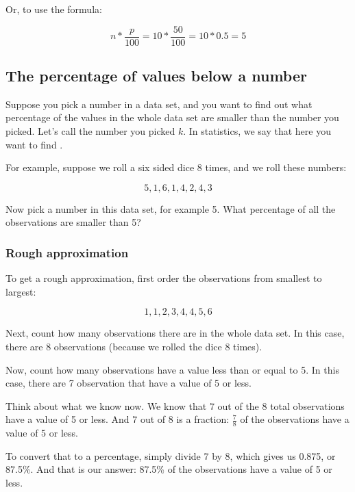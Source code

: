 \documentclass[../../../main.tex]{subfiles}
\begin{document}
\noindent
Or, to use the formula:

\begin{equation*}
  n * \frac{p}{100} = 10 * \frac{50}{100} = 10 * 0.5 = 5
\end{equation*}



\subsection{The percentage of values below a number}

Suppose you pick a number in a data set, and you want to find out what percentage of the values in the whole data set are smaller than the number you picked. Let's call the number you picked $k$. In statistics, we say that here you want to find .

For example, suppose we roll a six sided dice 8 times, and we roll these numbers:

\begin{equation*}
  5, 1, 6, 1, 4, 2, 4, 3
\end{equation*}

\noindent
Now pick a number in this data set, for example 5. What percentage of all the observations are smaller than 5? 


\subsubsection{Rough approximation}

To get a rough approximation, first order the observations from smallest to largest:

\begin{equation*}
  1, 1, 2, 3, 4, 4, 5, 6
\end{equation*}

\noindent
Next, count how many observations there are in the whole data set. In this case, there are 8 observations (because we rolled the dice 8 times).

Now, count how many observations have a value less than or equal to 5. In this case, there are 7 observation that have a value of 5 or less.

Think about what we know now. We know that 7 out of the 8 total observations have a value of 5 or less. And 7 out of 8 is a fraction: $\frac{7}{8}$ of the observations have a value of 5 or less. 

To convert that to a percentage, simply divide 7 by 8, which gives us 0.875, or 87.5\%. And that is our answer: 87.5\% of the observations have a value of 5 or less.
\end{document}

